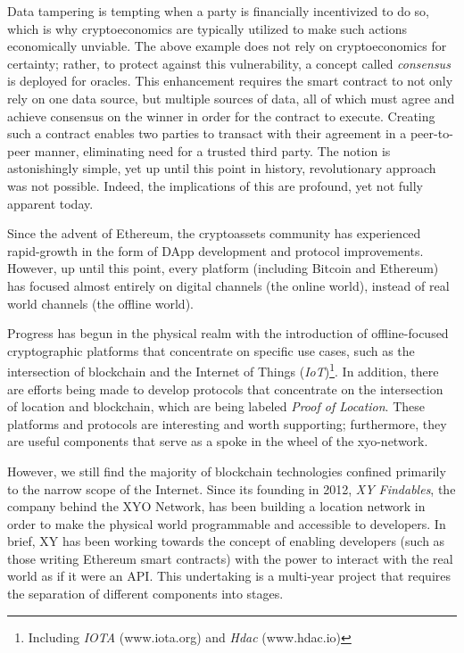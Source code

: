 \documentclass{article}
\begin{document}
Data tampering is tempting when a party is financially incentivized to do so, which is why \gls{cryptoeconomics} are typically utilized to make such actions economically unviable. The above example does not rely on cryptoeconomics for \gls{certainty}; rather, to protect against this vulnerability, a concept called \textit{consensus} is deployed for oracles. This enhancement requires the smart contract to not only rely on one data source, but multiple sources of data, all of which must agree and achieve consensus on the winner in order for the contract to execute. Creating such a contract enables two parties to transact with their agreement in a peer-to-peer manner, eliminating need for a trusted third party. The notion is astonishingly simple, yet up until this point in history, revolutionary approach was not possible. Indeed, the implications of this are profound, yet not fully apparent today.

Since the advent of Ethereum, the cryptoassets community has experienced rapid-growth in the form of DApp development and protocol improvements. However, up until this point, every platform (including Bitcoin and Ethereum) has focused almost entirely on digital channels (the online world), instead of real world channels (the offline world).

Progress has begun in the physical realm with the introduction of offline-focused cryptographic platforms that concentrate on specific use cases, such as the intersection of blockchain and the Internet of Things (\textit{IoT})\footnote{Including \textit{IOTA} (www.iota.org) and \textit{Hdac} (www.hdac.io)}. In addition, there are efforts being made to develop protocols that concentrate on the intersection of location and blockchain, which are being labeled \textit{Proof of Location}. These platforms and protocols are interesting and worth supporting; furthermore, they are useful components that serve as a spoke in the wheel of the \Gls{xyo-network}.

However, we still find the majority of blockchain technologies confined primarily to the narrow scope of the Internet. Since its founding in 2012, \textit{XY Findables}, the company behind the XYO Network, has been building a location network in order to make the physical world programmable and accessible to developers. In brief, XY has been working towards the concept of enabling developers (such as those writing Ethereum smart contracts) with the power to interact with the real world as if it were an API. This undertaking is a multi-year project that requires the separation of different components into stages.
\end{document}
